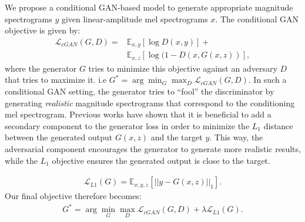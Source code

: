 \documentclass[a4paper]{article}
\begin{document}
We propose a conditional GAN-based model to generate appropriate magnitude spectrograms $y$ given linear-amplitude mel spectrograms $x$. The conditional GAN objective is given by:
\begin{align}
    \mathcal{L}_{\mathit{cGAN}}(G,D) = &\mathbb{E}_{x,y}[\log D(x,y)] + \nonumber \\
                 &\mathbb{E}_{x,z}[\log (1-D(x,G(x,z))],\label{cGAN_equation}
\end{align}
where the generator $G$ tries to minimize this objective against an adversary $D$ that tries to maximize it. i.e $G^*  = \arg\min_G \max_D \mathcal{L}_{\mathit{cGAN}}(G,D)$. 
In such a conditional GAN setting, 
the generator tries to ``fool'' the discriminator by generating \textit{realistic} magnitude spectrograms that correspond to the conditioning mel spectrogram.  
Previous works \cite{pix2pix,segan}  have shown that it is beneficial to add a secondary component to the generator loss in order to minimize the $L_1$ distance between the generated output $G(x,z)$ and the target $y$.
This way, the adversarial component encourages the generator to generate more realistic results,  while the $L_1$ objective ensures the generated output is close to the target.

\begin{align}
    \mathcal{L}_{L1}(G) = \mathbb{E}_{x,y,z}[{||y-G(x,z)||}_1].\label{L1_equation}
\end{align}
Our final objective therefore becomes:
\begin{align}
    G^*  = \arg\min_G\max_D \mathcal{L}_{\mathit{cGAN}}(G,D) + \lambda \mathcal{L}_{L1}(G).\label{full_objective}
\end{align}
\end{document}

